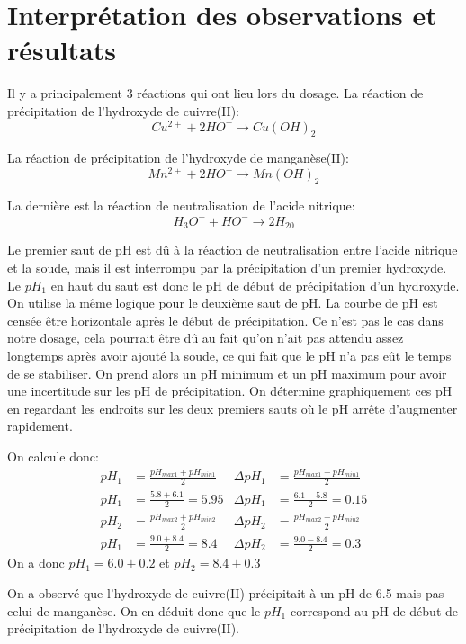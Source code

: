 \documentclass[12pt]{article}
\begin{document}
\section{Interprétation des observations et résultats}

Il y a principalement 3 réactions qui ont lieu lors du dosage. La réaction de précipitation de l'hydroxyde de cuivre(II):
\begin{equation}
Cu^{2+} + 2 H O^- \longrightarrow Cu(OH)_2
\end{equation}

La réaction de précipitation de l'hydroxyde de manganèse(II):
\begin{equation}
Mn^{2+} + 2 H O^- \longrightarrow Mn(OH)_2
\end{equation}

La dernière est la réaction de neutralisation de l'acide nitrique:
\begin{equation}
H_3 O^+ + H O^- \longrightarrow 2 H_20
\end{equation}

Le premier saut de pH est dû à la réaction de neutralisation entre l'acide nitrique et la soude, mais il est interrompu par la précipitation d'un premier hydroxyde. Le $pH_1$ en haut du saut est donc le pH de début de précipitation d'un hydroxyde. On utilise la même logique pour le deuxième saut de pH. La courbe de pH est censée être horizontale après le début de précipitation. Ce n'est pas le cas dans notre dosage, cela pourrait être dû au fait qu'on n'ait pas attendu assez longtemps après avoir ajouté la soude, ce qui fait que le pH n'a pas eût le temps de se stabiliser. On prend alors un pH minimum et un pH maximum pour avoir une incertitude sur les pH de précipitation. On détermine graphiquement ces pH en regardant les endroits sur les deux premiers sauts où le pH arrête d'augmenter rapidement.

On calcule donc:
\begin{align*}
pH_1&=\frac{pH_{max1}+pH_{min1}}{2} & \Delta pH_1 &= \frac{pH_{max1} - pH_{min1}}{2} \\
pH_1&=\frac{5.8+6.1}{2}=5.95 & \Delta pH_1 &= \frac{6.1- 5.8}{2}=0.15 \\
pH_2&=\frac{pH_{max2}+pH_{min2}}{2} & \Delta pH_2 &= \frac{pH_{max2} - pH_{min2}}{2} \\
pH_1&=\frac{9.0+8.4}{2}=8.4 & \Delta pH_2 &= \frac{9.0-8.4}{2}=0.3
\end{align*}
On a donc $pH_1=6.0 \pm 0.2$ et $pH_2=8.4 \pm 0.3$

On a observé que l'hydroxyde de cuivre(II) précipitait à un pH de 6.5 mais pas celui de manganèse. On en déduit donc que le $pH_1$ correspond au pH de début de précipitation de l'hydroxyde de cuivre(II).
\end{document}
